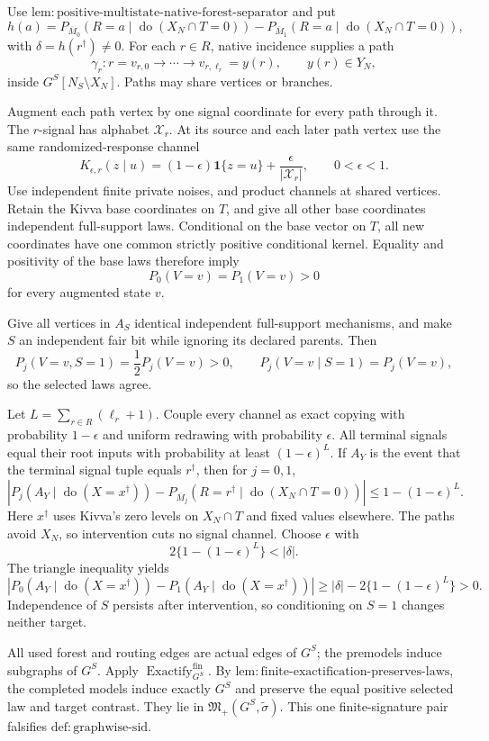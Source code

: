 Use \(\mathrm{lem:positive\text{-}multistate\text{-}native\text{-}forest\text{-}separator}\) and put
\[
 h(a)=P_{\overline M_0}(R=a\mid\operatorname{do}(X_N\cap T=0))
 -P_{\overline M_1}(R=a\mid\operatorname{do}(X_N\cap T=0)),
\]
with \(\delta=h(r^\dagger)\ne0\). For each \(r\in R\), native incidence supplies a path
\[
 \gamma_r:r=v_{r,0}\to\cdots\to v_{r,\ell_r}=y(r),
 \qquad y(r)\in Y_N,
\]
inside \(G^S[N_S\setminus X_N]\). Paths may share vertices or branches.

Augment each path vertex by one signal coordinate for every path through it. The \(r\)-signal has alphabet \(\mathcal X_r\). At its source and each later path vertex use the same randomized-response channel
\[
 K_{\epsilon,r}(z\mid u)
 =(1-\epsilon)\mathbf 1\{z=u\}+\frac{\epsilon}{|\mathcal X_r|},
 \qquad 0<\epsilon<1.
\]
Use independent finite private noises, and product channels at shared vertices. Retain the Kivva base coordinates on \(T\), and give all other base coordinates independent full-support laws. Conditional on the base vector on \(T\), all new coordinates have one common strictly positive conditional kernel. Equality and positivity of the base laws therefore imply
\[
 P_0(V=v)=P_1(V=v)>0
\]
for every augmented state \(v\).

Give all vertices in \(A_S\) identical independent full-support mechanisms, and make \(S\) an independent fair bit while ignoring its declared parents. Then
\[
 P_j(V=v,S=1)=\frac12P_j(V=v)>0,\qquad
 P_j(V=v\mid S=1)=P_j(V=v),
\]
so the selected laws agree.

Let \(L=\sum_{r\in R}(\ell_r+1)\). Couple every channel as exact copying with probability \(1-\epsilon\) and uniform redrawing with probability \(\epsilon\). All terminal signals equal their root inputs with probability at least \((1-\epsilon)^L\). If \(A_Y\) is the event that the terminal signal tuple equals \(r^\dagger\), then for \(j=0,1\),
\[
 \left|P_j(A_Y\mid\operatorname{do}(X=x^\dagger))
 -P_{\overline M_j}(R=r^\dagger\mid\operatorname{do}(X_N\cap T=0))\right|
 \le1-(1-\epsilon)^L.
\]
Here \(x^\dagger\) uses Kivva's zero levels on \(X_N\cap T\) and fixed values elsewhere. The paths avoid \(X_N\), so intervention cuts no signal channel. Choose \(\epsilon\) with
\[
 2\{1-(1-\epsilon)^L\}<|\delta|.
\]
The triangle inequality yields
\[
 |P_0(A_Y\mid\operatorname{do}(X=x^\dagger))
 -P_1(A_Y\mid\operatorname{do}(X=x^\dagger))|
 \ge|\delta|-2\{1-(1-\epsilon)^L\}>0.
\]
Independence of \(S\) persists after intervention, so conditioning on \(S=1\) changes neither target.

All used forest and routing edges are actual edges of \(G^S\); the premodels induce subgraphs of \(G^S\). Apply \(\operatorname{Exactify}^{\mathrm{fin}}_{G^S}\). By \(\mathrm{lem:finite\text{-}exactification\text{-}preserves\text{-}laws}\), the completed models induce exactly \(G^S\) and preserve the equal positive selected law and target contrast. They lie in \(\mathfrak M_+(G^S,\widetilde\sigma)\). This one finite-signature pair falsifies \(\mathrm{def:graphwise\text{-}sid}\).